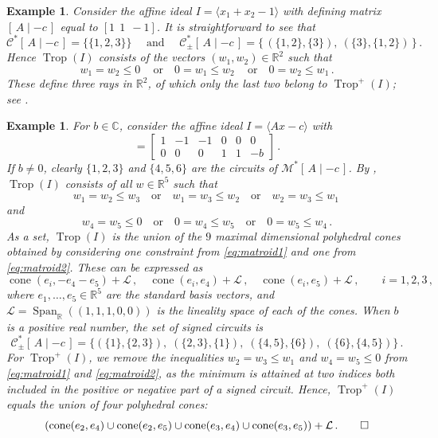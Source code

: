 \documentclass[11pt,reqno,a4paper]{amsart}
\numberwithin{equation}{section}
\theoremstyle{theoremstyle}
\theoremstyle{examplestyle}
\newtheorem{example}[theorem]{Example}
\newcommand{\CC}{\mathbb{C}}
\newcommand{\RR}{\mathbb{R}}
\newcommand{\mC}{\mathcal{C}}
\DeclareMathOperator{\cone}{cone}
\DeclareMathOperator{\Span}{Span}
\DeclareMathOperator{\Trop}{Trop}
\begin{document}
\begin{example}
\label{ex:polyhedralStructureAffine}
Consider the affine  ideal $I=\langle x_1+x_2-1\rangle$ with defining matrix $[\,A \mid -c\,]$ equal to $[1\ \ 1\ \ -1]$. It is straightforward to see that 
\[\mC^*[\,A \mid -c\,]=\big\{\{1,2,3\}\big\} \quad \text{ and } \quad \mC^*_\pm[\,A \mid -c\,] = \big\{\,(\{1,2\},\{3\}),\: (\{3\},\{1,2\})\,\big\}\,.\]
Hence $\Trop(I)$ consists of the vectors $(w_1,w_2)\in\RR^2$ such that 
\[ w_1=w_2\leq 0\,\quad \text{or} \quad 0=w_1\leq w_2\,\quad \text{or} \quad0=w_2\leq w_1\,.\]
These   define three rays in $\RR^2$,  of which only the last two belong to $\Trop^+(I)$; see   .
\end{example}

\begin{example}
\label{ex:BergmanFanRunning}
For $b\in \CC$, consider the affine  ideal $I=\langle A x - c \rangle $ 
with
\begin{equation*}
        [ A \, |\, -c] = \begin{bmatrix}
            1 & -1 &-1 & 0 &0 &0 \\
            0 & 0 & 0 & 1 & 1 & -b
        \end{bmatrix}\,.
    \end{equation*}
If $b\neq 0$, clearly $\{1,2,3\}$ and $\{4,5,6\}$ are the circuits of $\mathcal{M}^*[\, A \mid -c\,]$. 
    By , $\Trop(I)$ consists of all $w\in \RR^5$ such that  
\begin{equation}\label{eq:matroid1}
w_1=w_2 \leq w_3 \quad\text{or} \quad w_1=w_3 \leq w_2 \quad\text{or} \quad w_2=w_3 \leq w_1 \,
\end{equation}
and  
\begin{equation}\label{eq:matroid2} 
w_4=w_5 \leq 0 \quad\text{or} \quad 0=w_4 \leq w_5 \quad\text{or} \quad 0=w_5\leq w_4 \,.   
\end{equation}
As a set, $\Trop(I)$ is the union of the $9$ maximal dimensional polyhedral cones
obtained by considering one constraint from \eqref{eq:matroid1} and one from \eqref{eq:matroid2}. These can be expressed as 
\[ \cone(e_i,-e_4-e_5)+ \mathcal{L}\,,  \quad \cone(e_i,e_4)+ \mathcal{L}\,, \quad \cone(e_i,e_5)+ \mathcal{L}\,, \qquad i=1,2,3\,, \]
where $e_1,\dots,e_5 \in \mathbb{R}^5$ are the standard basis vectors, and $\mathcal{L} = \Span_{\RR}((1, 1, 1, 0, 0))$ is the lineality space of each of the cones. 
When $b$ is a positive real number, the  set of signed circuits is 
\[ \mathcal{C}^*_\pm[\,A\mid -c\,] = \big\{ (\{1\},\{2,3\}), \; (\{2,3\},\{1\}),\; (\{4,5\},\{6\}), \; (\{6\},\{4,5\}) \big\}\, .\]
For $\Trop^+(I)$, we   remove the inequalities $w_2=w_3 \leq w_1$ and $w_4=w_5 \leq 0$ from 
\eqref{eq:matroid1} and   \eqref{eq:matroid2}, as the minimum  is attained at two indices both included in the positive or negative part of a signed circuit. 
Hence, $\Trop^+(I)$ equals the union of four polyhedral cones:
    \begin{equation*}
       \left( \cone(e_2,e_4) \cup \cone(e_2,e_5) \cup \cone(e_3,e_4) \cup \cone(e_3,e_5)\right)+ \mathcal{L}\,.\qedhere
    \end{equation*}
\end{example}
\end{document}
